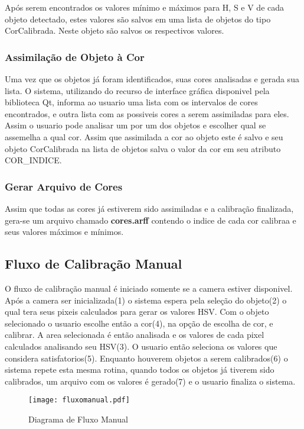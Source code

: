 Após serem encontrados os valores mínimo e máximos para H, S e V de cada objeto detectado, estes valores são salvos em uma lista de objetos do tipo CorCalibrada. Neste objeto são salvos os respectivos valores.

 \subsubsection{Assimilação de Objeto à Cor}
 Uma vez que os objetos já foram identificados, suas cores analisadas e gerada sua lista. O sistema, utilizando do recurso de interface gráfica disponivel pela biblioteca Qt, informa ao usuario uma lista com os intervalos de cores encontrados, e outra lista com as possiveis cores a serem assimiladas para eles. Assim o usuario pode analisar um por um dos objetos e escolher qual se assemelha a qual cor. Assim que assimilada a cor ao objeto este é salvo e seu objeto CorCalibrada na lista de objetos salva o valor da cor em seu atributo COR\_INDICE.
 
  \subsubsection{Gerar Arquivo de Cores}
  Assim que todas as cores já estiverem sido assimiladas e a calibração finalizada, gera-se um arquivo chamado \textbf{cores.arff} contendo o indice de cada cor calibraa e seus valores máximos e mínimos.
  
  		
  	\subsection{Fluxo de Calibração Manual}	
   	O fluxo de calibração manual é iniciado somente se a camera estiver disponivel. Após a camera ser inicializada(1) o sistema espera pela seleção do objeto(2) o qual tera seus pixeis calculados para gerar os valores HSV. Com o objeto selecionado o usuario escolhe então a cor(4), na opção de escolha de cor, e calibrar. A area selecionada é então analisada e os valores de cada pixel calculados analisando seu HSV(3).
   	O usuario então seleciona os valores que considera satisfatorios(5). Enquanto houverem objetos a serem calibrados(6) o sistema repete esta mesma rotina, quando todos os objetos já tiverem sido calibrados, um arquivo com os valores é gerado(7) e o usuario finaliza o sistema.
  		\begin{figure}[!h]
  				\centering
  				\texttt{[image: fluxomanual.pdf]}
  				\caption{Diagrama de Fluxo Manual}
  				\label{DiagramaDeFluxoManual}
  			\end{figure}
  			
